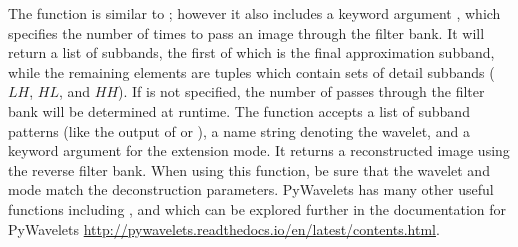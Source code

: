 The function  is similar to ; however it also includes a keyword argument , which specifies the number of times to pass an image through the filter bank.
It will return a list of subbands, the first of which is the final approximation subband, while the remaining elements are tuples which contain sets of detail subbands ($LH$, $HL$, and $HH$).
If  is not specified, the number of passes through the filter bank will be determined at runtime.
The function  accepts a list of subband patterns (like the output of  or ), a name string denoting the wavelet, and a keyword argument
 for the extension mode.
It returns a reconstructed image using the reverse filter bank.
When using this function, be sure that the wavelet and mode match the deconstruction parameters.
PyWavelets has many other useful functions including ,  and  which can be explored further in the documentation for PyWavelets \url{http://pywavelets.readthedocs.io/en/latest/contents.html}.

